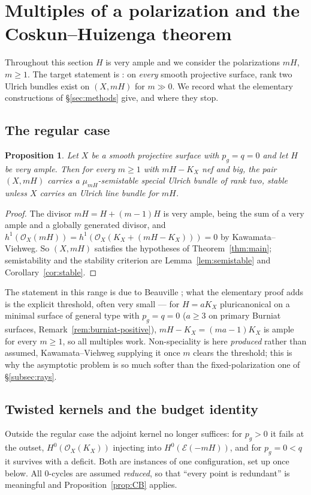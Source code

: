 \documentclass{amsart}
\newtheorem{proposition}[theorem]{Proposition}
\theoremstyle{definition}
\newcommand{\OO}{\mathcal{O}}
\newcommand{\EE}{\mathcal{E}}
\begin{document}
\section{Multiples of a polarization and the Coskun--Huizenga theorem}\label{sec:asymptotic}

Throughout this section $H$ is very ample and we consider the polarizations $mH$, $m\ge1$. The target statement is \cite[Thm.~1.2]{CH20}: on \emph{every} smooth projective surface, rank two Ulrich bundles exist on $(X,mH)$ for $m\gg0$. We record what the elementary constructions of \S\ref{sec:methods} give, and where they stop.

\subsection{The regular case}\label{subsec:asymptotic-reg}

\begin{proposition}\label{prop:asymptotic}
Let $X$ be a smooth projective surface with $p_g=q=0$ and let $H$ be very ample. Then for every $m\ge1$ with $mH-K_X$ nef and big, the pair $(X,mH)$ carries a $\mu_{mH}$-semistable special Ulrich bundle of rank two, stable unless $X$ carries an Ulrich line bundle for $mH$.
\end{proposition}

\begin{proof}
The divisor $mH=H+(m-1)H$ is very ample, being the sum of a very ample and a globally generated divisor, and $h^1(\OO_X(mH))=h^1(\OO_X(K_X+(mH-K_X)))=0$ by Kawamata--Viehweg. So $(X,mH)$ satisfies the hypotheses of Theorem~\ref{thm:main}; semistability and the stability criterion are Lemma~\ref{lem:semistable} and Corollary~\ref{cor:stable}.
\end{proof}

The statement in this range is due to Beauville \cite{Bea16b}; what the elementary proof adds is the explicit threshold, often very small --- for $H=aK_X$ pluricanonical on a minimal surface of general type with $p_g=q=0$ \textup{(}$a\ge3$ on primary Burniat surfaces, Remark~\ref{rem:burniat-positive}\textup{)}, $mH-K_X=(ma-1)K_X$ is ample for every $m\ge1$, so all multiples work. Non-speciality is here \emph{produced} rather than assumed, Kawamata--Viehweg supplying it once $m$ clears the threshold; this is why the asymptotic problem is so much softer than the fixed-polarization one of \S\ref{subsec:rays}.

\subsection{Twisted kernels and the budget identity}\label{subsec:pg}
Outside the regular case the adjoint kernel no longer suffices: for $p_g>0$ it fails at the outset, $H^0(\OO_X(K_X))$ injecting into $H^0(\EE(-mH))$, and for $p_g=0<q$ it survives with a deficit. Both are instances of one configuration, set up once below. All $0$-cycles are assumed \emph{reduced}, so that ``every point is redundant'' is meaningful and Proposition~\ref{prop:CB} applies.
\end{document}
